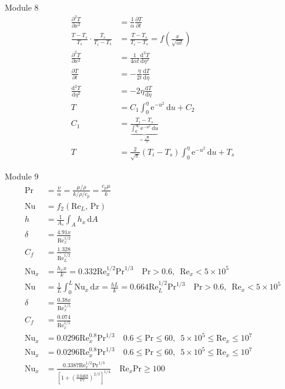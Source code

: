 \documentclass[24pt]{article}
\begin{document}
Module 8
\begin{align}
\frac{\partial^2T}{\partial x^2} &= \frac{1}{\alpha}\frac{\partial T}{\partial t} \\
\frac{T-T_s}{T_s}\cdot\frac{T_s}{T_i-T_s} &= \frac{T-T_s}{T_i-T_s}=f\left(\frac{x}{\sqrt{\alpha t}}\right) \\
\frac{\partial^2T}{\partial x^2} &= \frac{1}{4\alpha t}\frac{\mathrm{d}^2 T}{\mathrm{d}\eta^2} \\
\frac{\partial T}{\partial t} &= -\frac{\eta}{2 t}\frac{\mathrm{d} T}{\mathrm{d}\eta} \\
\frac{\mathrm{d}^2 T}{\mathrm{d}\eta^2} &= -2\eta \frac{\mathrm{d}T}{\mathrm{d}\eta} \\
T &= C_1 \int_0^\eta \mathrm{e}^{-u^2}\,\mathrm{d}u + C_2 \\
C_1 &= \frac{T_i-T_s}{\underbrace{\int_0^\infty \mathrm{e}^{-u^2}\,\mathrm{d}u}_{\text{$=\frac{\sqrt{\pi}}{2}$}}} \\
T &= \frac{2}{\sqrt{\pi}}(T_i-T_s)\int_0^\eta\mathrm{e}^{-u^2}\,\mathrm{d}u+T_s
\end{align}

Module 9
\begin{align}
\mbox{Pr} &= \frac{\nu}{\alpha} = \frac{\mu/\rho}{k/\rho/c_p} = \frac{c_p\mu}{k} \\
\mbox{Nu} &= f_2(\mbox{Re}_L,\,\mbox{Pr}) \\
h &= \frac{1}{A_s}\int_A\!h_x\,\mathrm{d}A \\
\delta &= \frac{4.91 x}{\mbox{Re}_x^{1/2}} \\
C_f &= \frac{1.328}{\mbox{Re}_L^{1/2}} \\
\mbox{Nu}_x &= \frac{h_x x}{k} = 0.332\mbox{Re}_x^{1/2}\mbox{Pr}^{1/3} \quad \mbox{Pr} > 0.6,\,\,\,\mbox{Re}_x < 5\times 10^5 \\
\mbox{Nu} &= \frac{1}{L}\int_0^L\!\mbox{Nu}_x\,\mathrm{d}x = \frac{h L}{k} = 0.664\mbox{Re}_L^{1/2}\mbox{Pr}^{1/3} \quad \mbox{Pr} > 0.6,\,\,\,\mbox{Re}_x < 5\times 10^5 \\
\delta &= \frac{0.38 x}{\mbox{Re}_x^{1/5}} \\
C_f &= \frac{0.074}{\mbox{Re}_x^{1/5}} \\
\mbox{Nu}_x &= 0.0296\mbox{Re}_x^{0.8}\mbox{Pr}^{1/3} \quad 0.6 \leq \mbox{Pr} \leq 60,\,\,\, 5 \times 10^5 \leq \mbox{Re}_x \leq 10^7 \\
\mbox{Nu}_x &= 0.0296\mbox{Re}_x^{0.8}\mbox{Pr}^{1/3} \quad 0.6 \leq \mbox{Pr} \leq 60,\,\,\, 5 \times 10^5 \leq \mbox{Re}_x \leq 10^7 \\
\mbox{Nu}_x &= \frac{0.3387\mbox{Re}_x^{1/2}\mbox{Pr}^{1/3}}{\left[1+\left(\frac{0.0468}{\mbox{Pr}}\right)^{2/3}\right]^{1/4}} \quad \mbox{Re}_x\mbox{Pr} \geq 100
\end{align}
\end{document}

